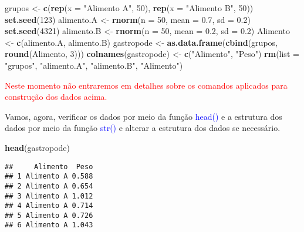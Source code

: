 \documentclass[titlepage, oneside, openany, a4paper]{book}
\newenvironment{Shaded}{\begin{snugshade}}{\end{snugshade}}
\newcommand{\DataTypeTok}[1]{\textcolor[rgb]{0.13,0.29,0.53}{#1}}
\newcommand{\DecValTok}[1]{\textcolor[rgb]{0.00,0.00,0.81}{#1}}
\newcommand{\FloatTok}[1]{\textcolor[rgb]{0.00,0.00,0.81}{#1}}
\newcommand{\KeywordTok}[1]{\textcolor[rgb]{0.13,0.29,0.53}{\textbf{#1}}}
\newcommand{\NormalTok}[1]{#1}
\newcommand{\StringTok}[1]{\textcolor[rgb]{0.31,0.60,0.02}{#1}}
\begin{document}
\begin{Shaded}
\begin{Highlighting}[]
\NormalTok{grupos <-}\StringTok{ }\KeywordTok{c}\NormalTok{(}\KeywordTok{rep}\NormalTok{(}\DataTypeTok{x =} \StringTok{"Alimento A"}\NormalTok{, }\DecValTok{50}\NormalTok{), }\KeywordTok{rep}\NormalTok{(}\DataTypeTok{x =} \StringTok{"Alimento B"}\NormalTok{, }\DecValTok{50}\NormalTok{))}
\KeywordTok{set.seed}\NormalTok{(}\DecValTok{123}\NormalTok{)}
\NormalTok{alimento.A <-}\StringTok{ }\KeywordTok{rnorm}\NormalTok{(}\DataTypeTok{n =} \DecValTok{50}\NormalTok{, }\DataTypeTok{mean =} \FloatTok{0.7}\NormalTok{, }\DataTypeTok{sd =} \FloatTok{0.2}\NormalTok{)}
\KeywordTok{set.seed}\NormalTok{(}\DecValTok{4321}\NormalTok{)}
\NormalTok{alimento.B <-}\StringTok{ }\KeywordTok{rnorm}\NormalTok{(}\DataTypeTok{n =} \DecValTok{50}\NormalTok{, }\DataTypeTok{mean =} \FloatTok{0.2}\NormalTok{, }\DataTypeTok{sd =} \FloatTok{0.2}\NormalTok{)}
\NormalTok{Alimento <-}\StringTok{ }\KeywordTok{c}\NormalTok{(alimento.A, alimento.B)}
\NormalTok{gastropode <-}\StringTok{ }\KeywordTok{as.data.frame}\NormalTok{(}\KeywordTok{cbind}\NormalTok{(grupos, }\KeywordTok{round}\NormalTok{(Alimento, }\DecValTok{3}\NormalTok{)))}
\KeywordTok{colnames}\NormalTok{(gastropode) <-}\StringTok{ }\KeywordTok{c}\NormalTok{(}\StringTok{"Alimento"}\NormalTok{, }\StringTok{"Peso"}\NormalTok{)}
\KeywordTok{rm}\NormalTok{(}\DataTypeTok{list =} \StringTok{"grupos"}\NormalTok{, }\StringTok{"alimento.A"}\NormalTok{, }\StringTok{"alimento.B"}\NormalTok{, }\StringTok{"Alimento"}\NormalTok{)}
\end{Highlighting}
\end{Shaded}

\textcolor{red}{Neste momento não entraremos em detalhes sobre os comandos aplicados para construção dos dados acima.}

Vamos, agora, verificar os dados por meio da função \textcolor{blue}{head()} e a estrutura dos dados por meio da função \textcolor{blue}{str()} e alterar a estrutura dos dados se necessário.

\begin{Shaded}
\begin{Highlighting}[]
\KeywordTok{head}\NormalTok{(gastropode)}
\end{Highlighting}
\end{Shaded}

\begin{verbatim}
##     Alimento  Peso
## 1 Alimento A 0.588
## 2 Alimento A 0.654
## 3 Alimento A 1.012
## 4 Alimento A 0.714
## 5 Alimento A 0.726
## 6 Alimento A 1.043
\end{verbatim}
\end{document}

